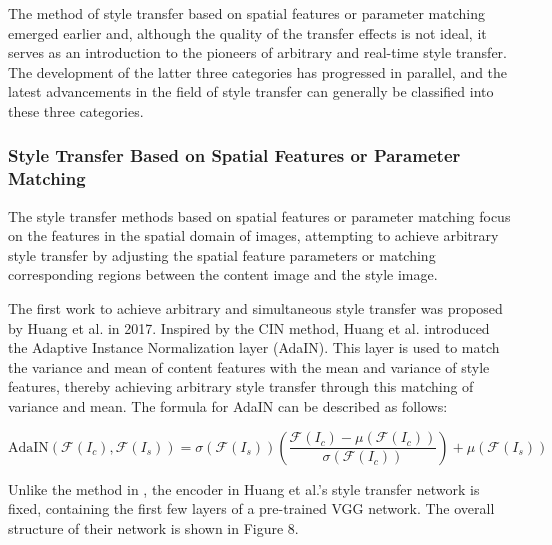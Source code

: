 The method of style transfer based on spatial features or parameter matching emerged earlier and, although the quality of the transfer effects is not ideal, it serves as an introduction to the pioneers of arbitrary and real-time style transfer. The development of the latter three categories has progressed in parallel, and the latest advancements in the field of style transfer can generally be classified into these three categories.

\subsubsection{Style Transfer Based on Spatial Features or Parameter Matching}

The style transfer methods based on spatial features or parameter matching focus on the features in the spatial domain of images, attempting to achieve arbitrary style transfer by adjusting the spatial feature parameters or matching corresponding regions between the content image and the style image.

The first work to achieve arbitrary and simultaneous style transfer was proposed by Huang et al. in 2017\citep{04huang2017arbitrary}. Inspired by the CIN method\citep{39dumoulin2016learned}, Huang et al. introduced the Adaptive Instance Normalization layer (AdaIN). This layer is used to match the variance and mean of content features with the mean and variance of style features, thereby achieving arbitrary style transfer through this matching of variance and mean. The formula for AdaIN can be described as follows:

\begin{equation}
    \label{AdaIN_equation}
    \text{AdaIN}(\mathcal{F}(I_c),\mathcal{F}(I_s))=\sigma(\mathcal{F}(I_s))\left(\frac{\mathcal{F}(I_c)-\mu(\mathcal{F}(I_c))}{\sigma(\mathcal{F}(I_c))}\right)+\mu(\mathcal{F}(I_s))
\end{equation}

Unlike the method in \citep{39dumoulin2016learned}, the encoder in Huang et al.'s style transfer network is fixed, containing the first few layers of a pre-trained VGG network. The overall structure of their network is shown in Figure 8.

